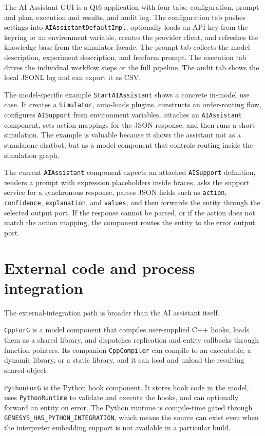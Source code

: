 The AI Assistant GUI is a Qt6 application with four tabs: configuration, prompt and plan, execution and results, and audit log. The configuration tab pushes settings into \texttt{AIAssistantDefaultImpl}, optionally loads an API key from the keyring or an environment variable, creates the provider client, and refreshes the knowledge base from the simulator facade. The prompt tab collects the model description, experiment description, and freeform prompt. The execution tab drives the individual workflow steps or the full pipeline. The audit tab shows the local JSONL log and can export it as CSV.

The model-specific example \texttt{StartAIAssistant} shows a concrete in-model use case. It creates a \texttt{Simulator}, auto-loads plugins, constructs an order-routing flow, configures \texttt{AISupport} from environment variables, attaches an \texttt{AIAssistant} component, sets action mappings for the JSON response, and then runs a short simulation. The example is valuable because it shows the assistant not as a standalone chatbot, but as a model component that controls routing inside the simulation graph.

The current \texttt{AIAssistant} component expects an attached \texttt{AISupport} definition, renders a prompt with expression placeholders inside braces, asks the support service for a synchronous response, parses JSON fields such as \texttt{action}, \texttt{confidence}, \texttt{explanation}, and \texttt{values}, and then forwards the entity through the selected output port. If the response cannot be parsed, or if the action does not match the action mapping, the component routes the entity to the error output port.

\section{External code and process integration}
\label{sec:external-code-process-integration}

The external-integration path is broader than the AI assistant itself.

\texttt{CppForG} is a model component that compiles user-supplied C++ hooks, loads them as a shared library, and dispatches replication and entity callbacks through function pointers. Its companion \texttt{CppCompiler} can compile to an executable, a dynamic library, or a static library, and it can load and unload the resulting shared object.

\texttt{PythonForG} is the Python hook component. It stores hook code in the model, uses \texttt{PythonRuntime} to validate and execute the hooks, and can optionally forward an entity on error. The Python runtime is compile-time gated through \texttt{GENESYS\_HAS\_PYTHON\_INTEGRATION}, which means the source can exist even when the interpreter embedding support is not available in a particular build.

